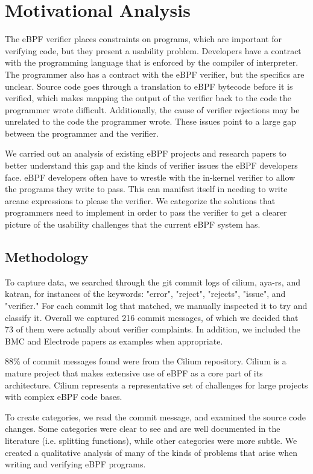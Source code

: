 \section{Motivational Analysis}

The eBPF verifier places constraints on programs, which are important for verifying code, but they present a usability problem.
Developers have a contract with the programming language that is enforced by the compiler of interpreter.
The programmer also has a contract with the eBPF verifier, but the specifics are unclear.
Source code goes through a translation to eBPF bytecode before it is verified, which makes mapping the output of the verifier back to the code the programmer wrote difficult.
Additionally, the cause of verifier rejections may be unrelated to the code the programmer wrote.
These issues point to a large gap between the programmer and the verifier.

We carried out an analysis of existing eBPF projects and research papers to better understand this gap and the kinds of verifier issues the eBPF developers face.
eBPF developers often have to wrestle with the in-kernel verifier to allow the programs they write to pass.
This can manifest itself in needing to write arcane expressions to please the verifier.
We categorize the solutions that programmers need to implement in order to pass the verifier to get a clearer picture of the usability challenges that the current eBPF system has.

\subsection{Methodology}
To capture data, we searched through the git commit logs of cilium, aya-rs, and katran, for instances of the keywords: "error", "reject", "rejects", "issue", and "verifier." 
For each commit log that matched, we manually inspected it to try and classify it.
Overall we captured 216 commit messages, of which we decided that 73 of them were actually about verifier complaints.
In addition, we included the BMC and Electrode papers as examples when appropriate.

88\% of commit messages found were from the Cilium repository.
Cilium is a mature project that makes extensive use of eBPF as a core part of its architecture.
Cilium represents a representative set of challenges for large projects with complex eBPF code bases.

To create categories, we read the commit message, and examined the source code changes.
Some categories were clear to see and are well documented in the literature (i.e. splitting functions), while other categories were more subtle.
We created a qualitative analysis of many of the kinds of problems that arise when writing and verifying eBPF programs.

